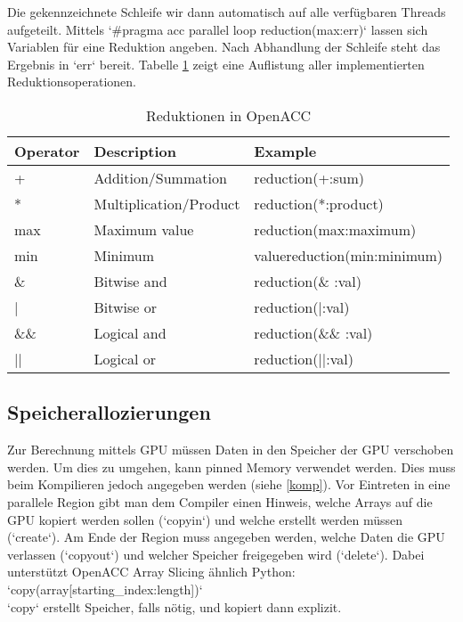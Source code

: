 			Die gekennzeichnete Schleife wir dann automatisch auf alle verfügbaren Threads aufgeteilt.
			Mittels \li`#pragma  acc parallel loop reduction(max:err)` lassen sich Variablen für eine Reduktion angeben. Nach Abhandlung der Schleife steht das Ergebnis in \li`err` bereit. Tabelle \ref{tab7:oaccred} zeigt eine Auflistung aller implementierten Reduktionsoperationen.
	
			\begin{table}[h]
			\centering
			\begin{tabular}{|l|l|l|}
				\toprule
				\textbf{Operator} & \textbf{Description} & \textbf{Example} \\\hline\hline
				+ & Addition/Summation & reduction(+:sum) \\\hline
				* & Multiplication/Product & reduction(*:product) \\\hline
		 		max & Maximum value & reduction(max:maximum) \\\hline
				min & Minimum & valuereduction(min:minimum) \\\hline
				\& & Bitwise and & reduction(\& :val) \\\hline
				| & Bitwise or & reduction(|:val) \\\hline
				\&\& & Logical and & reduction(\&\& :val) \\\hline
				|| & Logical or & reduction(||:val) \\\bottomrule
			\end{tabular}
			\caption{Reduktionen in OpenACC}
			\label{tab7:oaccred}
			\end{table}
		
			\subsection{Speicherallozierungen}
			Zur Berechnung mittels GPU müssen Daten in den Speicher der GPU verschoben werden. Um dies zu umgehen, kann pinned Memory verwendet werden. Dies muss beim Kompilieren jedoch angegeben werden (siehe \ref{komp}). Vor Eintreten in eine parallele Region gibt man dem Compiler einen Hinweis, welche Arrays auf die GPU kopiert werden sollen (\li`copyin`) und welche erstellt werden müssen (\li`create`). Am Ende der Region muss angegeben werden, welche Daten die GPU verlassen (\li`copyout`) und welcher Speicher freigegeben wird (\li`delete`). Dabei unterstützt OpenACC Array Slicing ähnlich Python:\\
			\li`copy(array[starting_index:length])`\\
			\li`copy` erstellt Speicher, falls nötig, und kopiert dann explizit.
			
